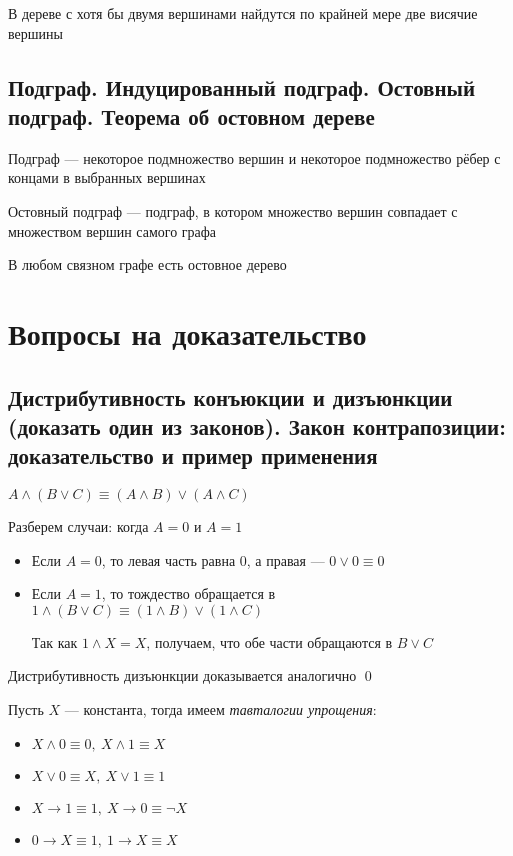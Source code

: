 \documentclass[a4paper]{article}
\begin{document}
\theorem В дереве с хотя бы двумя вершинами найдутся по крайней мере две висячие вершины


\subsection{Подграф. Индуцированный подграф. Остовный подграф. Теорема об остовном дереве}
 Подграф — некоторое подмножество вершин и некоторое подмножество рёбер с концами в выбранных вершинах

 Остовный подграф — подграф, в котором множество вершин совпадает с множеством вершин самого графа

\theorem В любом связном графе есть остовное дерево




\newpage
\section{Вопросы на доказательство}
\subsection{Дистрибутивность конъюкции и дизъюнкции (доказать один из законов). Закон контрапозиции: доказательство и пример применения}
\label{sec:2.1}\theorem $A\wedge(B\vee C)\equiv(A\wedge B)\vee(A\wedge C)$

\proof Разберем случаи: когда $A=0$ и $A=1$
\begin{itemize}
    \item Если $A=0$, то левая часть равна 0, а правая — $0\vee0\equiv0$
    \item Если $A=1$, то тождество обращается в $1\wedge(B\vee C)\equiv(1\wedge B)\vee(1\wedge C)$
    
    Так как  $1\wedge X=X$, получаем, что обе части обращаются в $B\vee C$
\end{itemize}
Дистрибутивность дизъюнкции доказывается аналогично \qed

 Пусть $X$ — константа, тогда имеем \textit{тавталогии упрощения}:
\begin{itemize}
    \item $X\wedge 0\equiv 0,\ X\wedge 1\equiv X$
    \item $X\vee 0\equiv X,\ X\vee 1\equiv 1$
    \item $X\rightarrow1\equiv1,\ X\rightarrow0\equiv\neg X$
    \item $0\rightarrow X\equiv1,\ 1\rightarrow X\equiv X$
\end{itemize}
\end{document}
